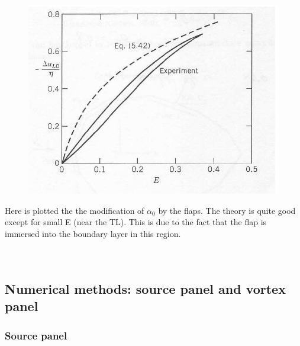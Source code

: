 	\begin{figure}
	\vspace{-5mm}
	\includegraphics[scale=0.3]{ch2/38}
	\end{figure}
	Here is plotted the the modification of $\alpha _0$ by the flaps. The theory is quite good except for small E (near the TL). This is due to the fact that the flap is immersed into the boundary layer in this region. 
	\ \\\\\\


\subsection{Numerical methods: source panel and vortex panel}
\subsubsection{Source panel}

